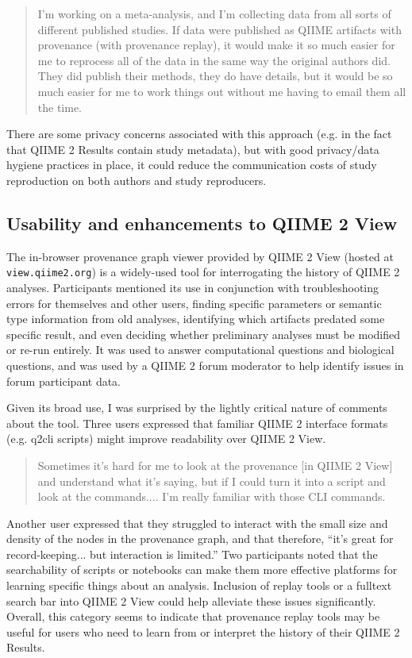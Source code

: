 \begin{quote}
I'm working on a meta-analysis, and I'm collecting data from all sorts of
different published studies. If data were published as QIIME artifacts with
provenance (with provenance replay), it would make it so much easier for me to
reprocess all of the data in the same way the original authors did. They did
publish their methods, they do have details, but it would be so much easier for
me to work things out without me having to email them all the time.
\end{quote}

\noindent There are some privacy concerns associated with this approach (e.g. in the fact
that QIIME 2 Results contain study metadata), but with good privacy/data hygiene
practices in place, it could reduce the communication costs of study
reproduction on both authors and study reproducers.

\subsection{Usability and enhancements to QIIME 2 View}
\label{section:q2view_enh}

The in-browser provenance graph viewer provided by QIIME 2 View (hosted at
\texttt{view.qiime2.org}) is a widely-used tool for interrogating the history of QIIME 2
analyses. Participants mentioned its use in conjunction with troubleshooting
errors for themselves and other users, finding specific parameters or semantic
type information from old analyses, identifying which artifacts predated some
specific result, and even deciding whether preliminary analyses must be modified
or re-run entirely. It was used to answer computational questions and biological
questions, and was used by a QIIME 2 forum moderator to help identify issues in
forum participant data.

Given its broad use, I was surprised by the lightly critical nature of comments
about the tool. Three users expressed that familiar QIIME 2 interface formats
(e.g. q2cli scripts) might improve readability over QIIME 2 View.

\begin{quote}
Sometimes it's hard for me to look at the provenance [in QIIME 2 View] and understand
what it's saying, but if I could turn it into a script and look at the
commands.... I'm really familiar with those CLI commands.
\end{quote}

\noindent Another user expressed that they struggled to interact with the small size and
density of the nodes in the provenance graph, and that therefore, “it's great
for record-keeping... but interaction is limited.” Two participants
noted that the searchability of scripts or notebooks can make them more
effective platforms for learning specific things about an analysis. Inclusion of
replay tools or a fulltext search bar into QIIME 2 View could help alleviate these
issues significantly. Overall, this category seems to indicate that provenance
replay tools may be useful for users who need to learn from or interpret the
history of their QIIME 2 Results.


